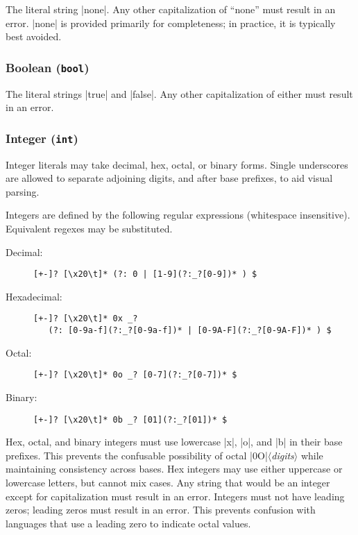 \documentclass[11pt]{article}
\newcommand{\vmeta}[1]{{\color{DarkRed}\ensuremath{\langle}\textit{#1}\ensuremath{\rangle}}}
\begin{document}
The literal string |none|.  Any other capitalization of ``none'' must result in an error.  |none| is provided primarily for completeness; in practice, it is typically best avoided.


\subsubsection{Boolean (\texttt{bool})}

The literal strings |true| and |false|.  Any other capitalization of either must result in an error.


\subsubsection{Integer (\texttt{int})}

Integer literals may take decimal, hex, octal, or binary forms.  Single underscores are allowed to separate adjoining digits, and after base prefixes, to aid visual parsing.

Integers are defined by the following regular expressions (whitespace insensitive).  Equivalent regexes may be substituted.
\begin{description}
\item[Decimal:]\hfill
\begin{Verbatim}
[+-]? [\x20\t]* (?: 0 | [1-9](?:_?[0-9])* ) $
\end{Verbatim}
\item[Hexadecimal:]\hfill
\begin{Verbatim}
[+-]? [\x20\t]* 0x _?
   (?: [0-9a-f](?:_?[0-9a-f])* | [0-9A-F](?:_?[0-9A-F])* ) $
\end{Verbatim}
\item[Octal:]\hfill
\begin{Verbatim}
[+-]? [\x20\t]* 0o _? [0-7](?:_?[0-7])* $
\end{Verbatim}
\item[Binary:]\hfill
\begin{Verbatim}
[+-]? [\x20\t]* 0b _? [01](?:_?[01])* $
\end{Verbatim}
\end{description}
Hex, octal, and binary integers must use lowercase |x|, |o|, and |b| in their base prefixes.  This prevents the confusable possibility of octal |0O|\vmeta{digits} while maintaining consistency across bases.  Hex integers may use either uppercase or lowercase letters, but cannot mix cases.  Any string that would be an integer except for capitalization must result in an error.  Integers must not have leading zeros; leading zeros must result in an error.  This prevents confusion with languages that use a leading zero to indicate octal values.
\end{document}
